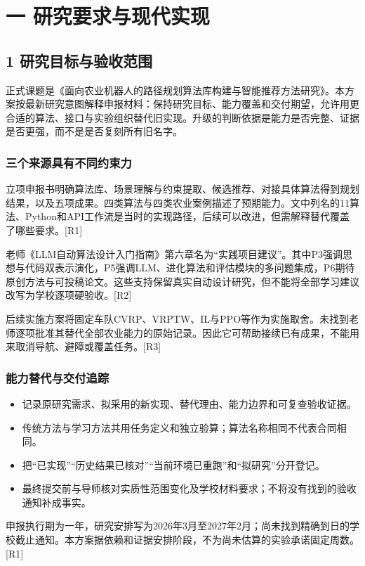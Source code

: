 \documentclass[11pt,a4paper]{article}
\newcommand{\bodytext}[1]{#1\par}
\begin{document}
\section{一 研究要求与现代实现}
\subsection{1  研究目标与验收范围}
\bodytext{正式课题是《面向农业机器人的路径规划算法库构建与智能推荐方法研究》。本方案按最新研究意图解释申报材料：保持研究目标、能力覆盖和交付期望，允许用更合适的算法、接口与实验组织替代旧实现。升级的判断依据是能力是否完整、证据是否更强，而不是是否复刻所有旧名字。}
\subsubsection{三个来源具有不同约束力}
\bodytext{立项申报书明确算法库、场景理解与约束提取、候选推荐、对接具体算法得到规划结果，以及五项成果。四类算法与四类农业案例描述了预期能力。文中列名的11算法、Python和API工作流是当时的实现路径，后续可以改进，但需解释替代覆盖了哪些要求。[R1]}
\bodytext{老师《LLM自动算法设计入门指南》第六章名为“实践项目建议”。其中P3强调思想与代码双表示演化，P5强调LLM、进化算法和评估模块的多问题集成，P6期待原创方法与可投稿论文。这些支持保留真实自动设计研究，但不能将全部学习建议改写为学校逐项硬验收。[R2]}
\bodytext{后续实施方案将固定车队CVRP、VRPTW、IL与PPO等作为实施取舍。未找到老师逐项批准其替代全部农业能力的原始记录。因此它可帮助接续已有成果，不能用来取消导航、避障或覆盖任务。[R3]}
\subsubsection{能力替代与交付追踪}
\begin{itemize}
\item 记录原研究需求、拟采用的新实现、替代理由、能力边界和可复查验收证据。
\item 传统方法与学习方法共用任务定义和独立验算；算法名称相同不代表合同相同。
\item 把“已实现”“历史结果已核对”“当前环境已重跑”和“拟研究”分开登记。
\item 最终提交前与导师核对实质性范围变化及学校材料要求；不将没有找到的验收通知补成事实。
\end{itemize}
\bodytext{申报执行期为一年，研究安排写为2026年3月至2027年2月；尚未找到精确到日的学校截止通知。本方案据依赖和证据安排阶段，不为尚未估算的实验承诺固定周数。[R1]}
\end{document}
